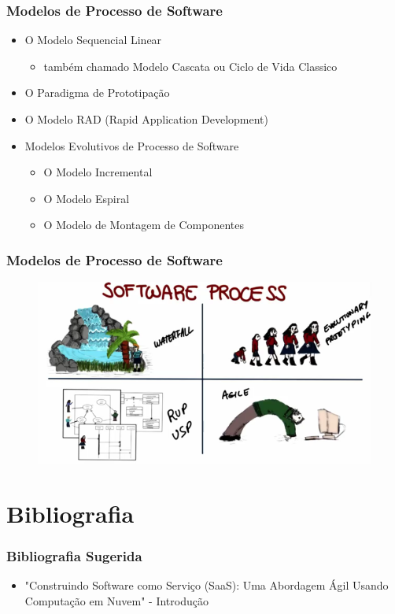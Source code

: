 \begin{frame}
 \frametitle{Modelos de Processo de Software}
 \begin{itemize}
  \item  O Modelo Sequencial Linear
  \begin{itemize}
   \item também chamado Modelo Cascata ou Ciclo de Vida Classico
  \end{itemize}
  \item O Paradigma de Prototipação
  \item O Modelo RAD (Rapid Application Development)
  \item Modelos Evolutivos de Processo de Software
  \begin{itemize}
   \item O Modelo Incremental
   \item O Modelo Espiral
   \item O Modelo de Montagem de Componentes
  \end{itemize}
 \end{itemize}
\end{frame}


\begin{frame}
\frametitle{Modelos de Processo de Software}
 \begin{figure}
  \includegraphics[width = \textwidth]{figs/fig19.png}
 \end{figure}
\end{frame}

\section{Bibliografia}

\begin{frame}
 \frametitle{Bibliografia Sugerida}
 \begin{itemize}
  \item "Construindo Software como Serviço (SaaS): Uma Abordagem Ágil Usando Computação em Nuvem" - Introdução

 \end{itemize}

\end{frame}
% 
